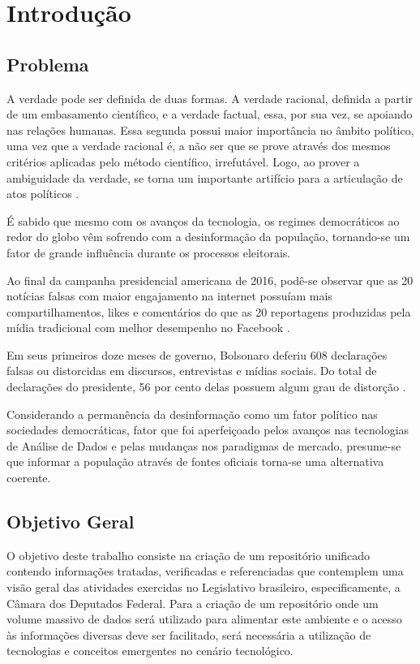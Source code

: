 \chapter{Introdução}
\label{introducao}

\section{Problema}
A verdade pode ser definida de duas formas. A verdade racional, definida a partir de um embasamento científico, e a verdade factual, essa, por sua vez, se apoiando nas relações humanas. Essa segunda possui maior importância no âmbito político, uma vez que a verdade racional é, a não ser que se prove através dos mesmos critérios aplicadas pelo método científico, irrefutável. Logo, ao prover a ambiguidade da verdade, se torna um importante artifício para a articulação de atos políticos \cite{entrepassadofuturo}.

É sabido que mesmo com os avanços da tecnologia, os regimes democráticos ao redor do globo vêm sofrendo com a desinformação da população, tornando-se um fator de grande influência durante os processos eleitorais.

Ao final da campanha presidencial americana de 2016, podê-se observar que as 20 notícias falsas com maior engajamento na internet possuíam mais compartilhamentos, likes e comentários do que as 20 reportagens produzidas pela mídia tradicional com melhor desempenho no Facebook \cite{facebookamericananalysis}. 

Em seus primeiros doze meses de governo, Bolsonaro deferiu 608 declarações falsas ou distorcidas em discursos, entrevistas e mídias sociais. Do total de declarações do presidente, 56 por cento delas possuem algum grau de distorção \cite{declaracoesbolsonaro}.

Considerando a permanência da desinformação como um fator político nas sociedades democráticas, fator que foi aperfeiçoado pelos avanços nas tecnologias de Análise de Dados e pelas mudanças nos paradigmas de mercado, presume-se que informar a população através de fontes oficiais torna-se uma alternativa coerente.

\section{Objetivo Geral}
O objetivo deste trabalho consiste na criação de um repositório unificado contendo informações tratadas, verificadas e referenciadas que contemplem uma visão geral das atividades exercidas no Legislativo brasileiro, especificamente, a Câmara dos Deputados Federal. Para a criação de um repositório onde um volume massivo de dados será utilizado para alimentar este ambiente e o acesso às informações diversas deve ser facilitado, será necessária a utilização de tecnologias e conceitos emergentes no cenário tecnológico.

